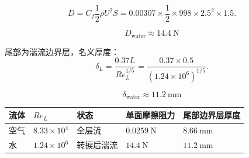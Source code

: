 \documentclass[11pt,a4paper]{ctexart}
\begin{document}
\[
D=\bar C_f\frac12\rho U^2S
=0.00307\times\frac12\times998\times2.5^2\times1.5.
\]

\[
\boxed{D_{\mathrm{water}}\approx14.4\ \mathrm{N}}
\]

尾部为湍流边界层，名义厚度：
\[
\delta_L=\frac{0.37L}{Re_L^{1/5}}
=\frac{0.37\times0.5}{(1.24\times10^6)^{1/5}}.
\]

\[
\boxed{\delta_{\mathrm{water}}\approx11.2\ \mathrm{mm}}
\]

\begin{center}
\begin{tabular}{lllll}
\toprule
流体 & \(Re_L\) & 状态 & 单面摩擦阻力 & 尾部边界层厚度\\
\midrule
空气 & \(8.33\times10^4\) & 全层流 & \(0.0259\ \mathrm{N}\) & \(8.66\ \mathrm{mm}\)\\
水 & \(1.24\times10^6\) & 转捩后湍流 & \(14.4\ \mathrm{N}\) & \(11.2\ \mathrm{mm}\)\\
\bottomrule
\end{tabular}
\end{center}
\end{document}
